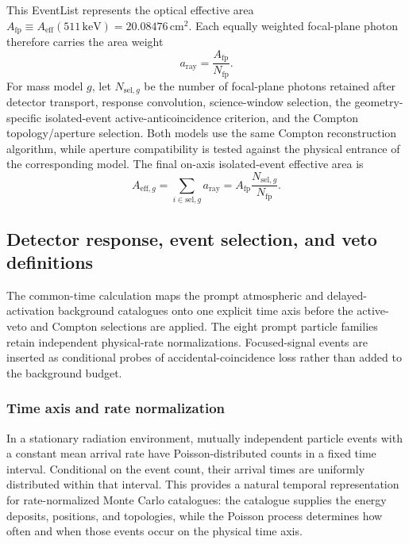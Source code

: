 \documentclass[11pt]{article}
\newcommand{\keV}{\ensuremath{\,\mathrm{keV}}}
\begin{document}
This EventList represents the optical effective area
$A_{\mathrm{fp}}\equiv A_{\mathrm{eff}}(511\keV)=20.08476\,\mathrm{cm^2}$.
Each equally weighted focal-plane photon therefore carries the area weight
\begin{equation}
 a_{\mathrm{ray}}=\frac{A_{\mathrm{fp}}}{N_{\mathrm{fp}}}.
 \label{eq:focal_eventlist_area_weight}
\end{equation}
For mass model $g$, let $N_{\mathrm{sel},g}$ be the number of focal-plane
photons retained after detector transport, response convolution, science-window
selection, the geometry-specific isolated-event active-anticoincidence
criterion, and the Compton topology/aperture selection. Both models use the
same Compton reconstruction algorithm, while aperture compatibility is tested
against the physical entrance of the corresponding model. The final on-axis
isolated-event effective area is
\begin{equation}
 A_{\mathrm{eff},g}
 =\sum_{i\in\mathrm{sel},g}a_{\mathrm{ray}}
 =A_{\mathrm{fp}}\frac{N_{\mathrm{sel},g}}{N_{\mathrm{fp}}}.
 \label{eq:selected_signal_effective_area}
\end{equation}

\endgroup



\subsection{Detector response, event selection, and veto definitions}
\label{sec:selection}

The common-time calculation maps the prompt atmospheric and delayed-activation
background catalogues onto one explicit time axis before the active-veto and
Compton selections are applied. The eight prompt particle families
retain independent physical-rate normalizations. Focused-signal events are inserted as
conditional probes of accidental-coincidence loss rather than added to the
background budget.

\subsubsection{Time axis and rate normalization}
\label{subsec:time_axis}

In a stationary radiation environment, mutually independent particle events
with a constant mean arrival rate have Poisson-distributed counts in a fixed
time interval. Conditional on the event count, their arrival times are
uniformly distributed within that interval. This provides a natural temporal
representation for rate-normalized Monte Carlo catalogues: the catalogue
supplies the energy deposits, positions, and topologies, while the Poisson
process determines how often and when those events occur on the physical time
axis.
\end{document}

